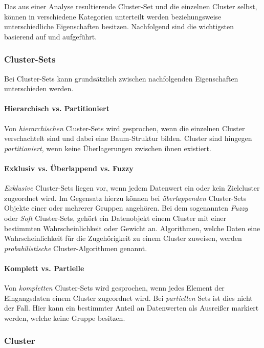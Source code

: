 Das aus einer Analyse resultierende Cluster-Set und die einzelnen Cluster selbst,
können in verschiedene Kategorien unterteilt werden beziehungsweise unterschiedliche Eigenschaften besitzen.
Nachfolgend sind die wichtigsten basierend auf \cite[]{tan2007introduction} und \cite[]{Jain1999,Jain2010} aufgeführt.

\subsubsection{Cluster-Sets}

Bei Cluster-Sets kann grundsätzlich zwischen nachfolgenden Eigenschaften unterschieden werden.

\paragraph{Hierarchisch vs. Partitioniert}
Von \textit{hierarchischen} Cluster-Sets wird gesprochen, wenn die einzelnen Cluster verschachtelt sind und dabei eine
Baum-Struktur bilden. Cluster sind hingegen \textit{partitioniert}, wenn keine Überlagerungen zwischen ihnen existiert.

\paragraph{Exklusiv vs. Überlappend vs. Fuzzy}
\textit{Exklusive} Cluster-Sets liegen vor, wenn jedem Datenwert ein oder kein Zielcluster zugeordnet wird.
Im Gegensatz hierzu können bei \textit{überlappenden} Cluster-Sets Objekte einer oder mehrerer Gruppen angehören.
Bei dem sogenannten \textit{Fuzzy} oder \textit{Soft} Cluster-Sets, gehört ein Datenobjekt einem Cluster
mit einer bestimmten Wahrscheinlichkeit oder Gewicht an. Algorithmen, welche Daten eine
Wahrscheinlichkeit für die Zugehörigkeit zu einem Cluster zuweisen, werden \textit{probabilistische}
Cluster-Algorithmen genannt.

\paragraph{Komplett vs. Partielle}
Von \textit{kompletten} Cluster-Sets wird gesprochen, wenn jedes Element der Eingangsdaten einem Cluster zugeordnet wird.
Bei \textit{partiellen} Sets ist dies nicht der Fall. Hier kann ein bestimmter Anteil an Datenwerten als Ausreißer markiert
werden, welche keine Gruppe besitzen.


\subsubsection{Cluster}

